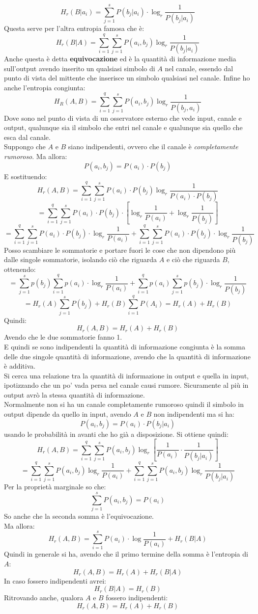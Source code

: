 \documentclass[a4paper,12pt, oneside]{book}
\begin{document}
\[H_r(B|a_i)=\sum_{j=1}^s P(b_j|a_i)\cdot \log_r\frac{1}{P(b_j|a_i)}\]
Questa serve per l'altra entropia famosa che è:
\[H_r(B|A)=\sum_{i=1}^q\sum_{j=1}^s P(a_i,b_j)\log_r\frac{1}{P(b_j|a_i)}\]
Anche questa è detta \textbf{equivocazione} ed è la quantità di informazione
media sull'output avendo inserito un qualsiasi simbolo di $A$ nel canale,
essendo dal punto di vista del mittente che inserisce un simbolo qualsiasi nel
canale. 
Infine ho anche l'entropia congiunta:
\[H_R(A,B)=\sum_{i=1}^q\sum_{j=1}^s P(a_i,b_j)\log_r\frac{1}{P(b_j,a_i)}\]
Dove sono nel punto di vista di un osservatore esterno che vede input, canale e
output, qualunque sia il simbolo che entri nel canale e qualunque sia quello che
esca dal canale. \\
Suppongo che $A$ e $B$ siano indipendenti, ovvero che il canale è
\textit{completamente rumoroso}. Ma allora: 
\[P(a_i,b_j)=P(a_i)\cdot P(b_j)\]
E sostituendo:
\[H_r(A,B)=\sum_{i=1}^q\sum_{j=1}^s P(a_i)\cdot
  P(b_j)\log_r\frac{1}{P(a_i)\cdot P(b_j)}\]
\[=\sum_{i=1}^q\sum_{j=1}^s P(a_i)\cdot
  P(b_j)\cdot \left[\log_r\frac{1}{P(a_i)}+\log_r\frac{1}{P(b_j)}\right]\]
\[=\sum_{i=1}^q\sum_{j=1}^s P(a_i)\cdot
  P(b_j)\cdot \log_r\frac{1}{P(a_i)}+\sum_{i=1}^q\sum_{j=1}^s P(a_i)\cdot
  P(b_j)\cdot \log_r\frac{1}{P(b_j)}\]
Posso scambiare le sommatorie e portare fuori le cose che non dipendono più
dalle singole sommatorie, isolando ciò che riguarda $A$ e ciò che riguarda $B$,
ottenendo: 
\[=\sum_{j=1}^sp(b_j)\sum_{i=1}^qp(a_i)\cdot
  \log_r\frac{1}{P(a_i)}+\sum_{i=1}^qp(a_i)\sum_{j=1}^sp(b_j)\cdot
  \log_r\frac{1}{P(b_j)}\]
\[=H_r(A)\sum_{j=1}^sP(b_j)+H_r(B)\sum_{i=1}^qP(A_i)=H_r(A)+H_r(B)\]
Quindi:
\[H_r(A,B)=H_r(A)+H_r(B)\]
Avendo che le due sommatorie fanno 1.\\
E quindi se sono indipendenti la quantità di informazione congiunta è la somma
delle due singole quantità di informazione, avendo che la quantità di
informazione è additiva.\\
Si cerca una relazione tra la quantità di informazione in output e quella in
input, ipotizzando che un po' vada persa nel canale causi rumore. Sicuramente al
più in output avrò la stessa quantità di informazione. \\
Normalmente non si ha un canale completamente rumoroso quindi il simbolo in
output dipende da quello in input, avendo $A$ e $B$ non indipendenti ma si ha:
\[P(a_i,b_j)=P(a_i)\cdot P(b_j|a_i)\]
usando le probabilità in avanti che ho già a disposizione. Si ottiene quindi:
\[H_r(A,B)=\sum_{i=1}^q\sum_{j=1}^s P(a_i,b_j)\log_r\left[\frac{1}{P(a_i)}\cdot
    \frac{1}{P(b_j|a_i)}\right]\]
\[=\sum_{i=1}^q\sum_{j=1}^s
  P(a_i,b_j)\log_r\frac{1}{P(a_i)}+\sum_{i=1}^q\sum_{j=1}^s
  P(a_i,b_j)\log_r\frac{1}{P(b_j|a_i)}\]
Per la proprietà marginale so che:
\[\sum_{j=1}^s P(a_i,b_j)=P(a_i)\]
So anche che la seconda somma è l'equivocazione.\\
Ma allora:
\[H_r(A,B)=\sum_{i=1}^s P(a_i)\cdot \log\frac{1}{P(a_i)}+H_r(B|A)\]
Quindi in generale si ha, avendo che il primo termine della somma è l'entropia
di $A$:
\[H_r(A,B)=H_r(A)+H_r(B|A)\]
In caso fossero indipendenti avrei:
\[H_r(B|A)=H_r(B)\]
Ritrovando anche, qualora $A$ e $B$ fossero indipendenti:
\[H_r(A,B)=H_r(A)+H_r(B)\]
\end{document}
